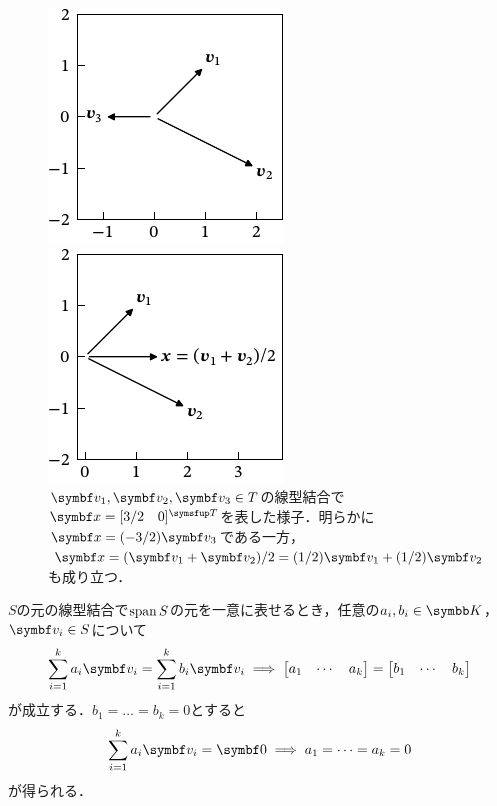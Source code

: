 \documentclass[../../main]{subfiles}
\begin{document}
\begin{figure}[htbp]
  \centering
  \begin{minipage}{\linewidth/2}
    \centering
    \includegraphics{linear_comb1.pdf}
  \end{minipage}%
  \begin{minipage}{\linewidth/2}
    \centering
    \includegraphics{linear_comb2.pdf}    
  \end{minipage}
  \caption{\(\vect{v}_1,\vect{v}_2,\vect{v}_3\in T\)の線型結合で\(\vect{x}=\trps{[\begin{matrix}3/2 & 0\end{matrix}]}\)を表した様子．明らかに\(\vect{x}=(-3/2)\vect{v}_3\)である一方，\(\vect{x}=(\vect{v}_1+\vect{v}_2)/2=(1/2)\vect{v}_1+(1/2)\vect{v}_2\)も成り立つ．}
  \label{figure:linear_comb}
\end{figure}

\(S\)の元の線型結合で\(\operatorname{span} S\)の元を一意に表せるとき，任意の\(a_i,b_i\in\numset{K}\)，\(\vect{v}_i\in S\)について
\[
  \sum_{i=1}^ka_i\vect{v}_i = \sum_{i=1}^kb_i\vect{v}_i
  \implies \begin{bmatrix}a_1 & \cdots & a_k\end{bmatrix} = \begin{bmatrix}b_1 & \cdots & b_k\end{bmatrix} 
\]
が成立する．\(b_1=\dots=b_k=0\)とすると
\begin{equation}
  \label{equation:independence}
  \sum_{i=1}^ka_i\vect{v}_i = \zvec
  \implies a_1 = \dots = a_k = 0
\end{equation}
が得られる．
\end{document}
